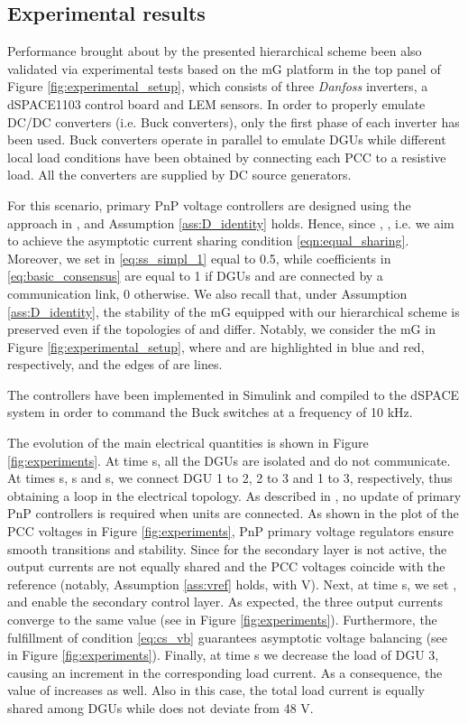 \documentclass[a4paper]{article}
\theoremstyle{plain}
\begin{document}
\subsection{Experimental results}
\label{sec:experiments}
Performance brought about by the presented hierarchical scheme been also validated via experimental tests based on the mG platform in the top panel of Figure \ref{fig:experimental_setup}, which consists of three \textit{Danfoss} inverters, a dSPACE1103 control board and LEM sensors. In order to properly emulate DC/DC converters (i.e. Buck converters), only the first phase of each inverter has been used. Buck converters operate in parallel to emulate DGUs while different local load conditions have been obtained by connecting each PCC to a resistive load. All the converters are supplied by DC source generators.

For this scenario, primary PnP voltage controllers are designed using the approach in \cite{tucci2016improved}, and Assumption \ref{ass:D_identity} holds. Hence, since , , i.e. we aim to achieve the asymptotic current sharing condition \eqref{eqn:equal_sharing}. Moreover, we set  in \eqref{eq:ss_simpl_1} equal to 0.5, while coefficients  in \eqref{eq:basic_consensus} are equal to 1 if DGUs  and  are connected by a communication link, 0 otherwise. We also recall that, under Assumption \ref{ass:D_identity}, the stability of the mG equipped with our hierarchical scheme is preserved even if the topologies of  and  differ. Notably, we consider the mG in Figure \ref{fig:experimental_setup}, where  and  are highlighted in blue and red, respectively, and the edges of  are  lines.
	
The controllers have been implemented in Simulink and compiled to the dSPACE system in order to command the Buck switches at a frequency of 10 kHz.

The evolution of the main electrical quantities is shown in Figure \ref{fig:experiments}. At time  s, all the DGUs are isolated and do not communicate. At times  s,  s and  s, we connect DGU 1 to 2, 2 to 3 and 1 to 3, respectively, thus obtaining a loop in the electrical topology. As described in \cite{tucci2016improved}, no update of primary PnP controllers is required when units are connected. As shown in the plot of the PCC voltages in Figure \ref{fig:experiments}, PnP primary voltage regulators ensure smooth transitions and stability. Since for  the secondary layer is not active, the output currents are not equally shared and the PCC voltages coincide with the reference (notably, Assumption \ref{ass:vref} holds, with  V). Next, at time  s, we set ,  and enable the secondary control layer. As expected, the three output currents converge to the same value (see  in Figure \ref{fig:experiments}). Furthermore, the fulfillment of condition \eqref{eq:cs_vb} guarantees asymptotic voltage balancing (see  in Figure \ref{fig:experiments}). Finally, at time  s we decrease the load of DGU 3, causing an increment in the corresponding load current. As a consequence, the value of  increases as well. Also in this case, the total load current is equally shared among DGUs while  does not deviate from 48 V.
\end{document}

